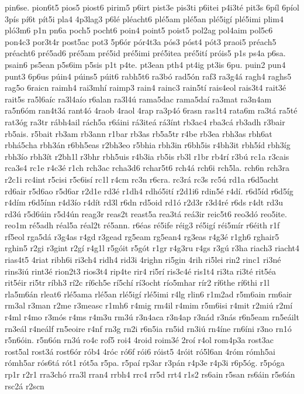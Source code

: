 {pin6se.
pion6t5
pios5
piost6
pirim5
p6irt
pist3e
pis3ti
p6itei
p4i3té
pit3s
6píl
6píol
3pís
pí6t
pít5i
pla4
4p3lag3
p6lé
pléacht6
plé5am
plé5an
plé5igí
plé5imi
plim4
pló3m6
p1n
pn6a
poch5
pocht6
poin4
point5
poist5
pol2ag
pol4aim
pol5c6
pon4c3
por3t4r
post5ac
pot3
5p6ór
pór4t3a
pós3
póst4
pót3
praoi5
préach5
préacht6
pré5ad6
pré5am
pré5id
pré5imi
pré5itea
pré5ití
próis5
p1s
ps4a
p6sa.
psain6
ps5ean
p5s6im
p5sis
p1t
p4te.
pt3ean
pth4
pt4ig
pt3is
6pu.
puin2
pun4
punt3
6p6us
púin4
púins5
púit6
rabh5t6
ra3bó
rad5ón
raf3
ra3g4á
ragh4
raghs5
rag5o
6raicn
raimh4
rai3mhí
raimp3
rain4
rainc3
rain5tí
rais4eol
rais3t4
rait3é
rait5s
ra5l6aíc
ra3l4aío
r6alan
ra3l4ú
rama5dac
rama5daí
ra3mat
ra3n4am
ra5n6óm
ran4t3á
rant4ó
4raob
4raol
4rap
ra3p4ó
6rasn
ras1t4
rata6m
ra3tá
ra5té
rat3óg
ra3tr
rábh4ail
rách5a
r6áini
rá3iteá
rá3ínt
rb3ac4
rba3cá
rb3adh
r3bair
rb5ais.
r5bait
rb3am
rb3ann
r1bar
rb3as
rb5a5tr
r4be
rb3ea
rbh3as
rbh6at
rbhá5cha
rbh3án
r6bh5eas
r2bh3eo
r5bhia
rbh3in
r6bh5is
r4bh3it
rbh5íd
rbh3íg
rbh3ío
rbh3ít
r2bh1l
r3bhr
rbh5uis
r4b3ia
rb5is
rb3l
r1br
rb4rí
r3bú
rc1a
r3cais
rca3s4
rc1e
r4c3é
r1ch
rch3ac
rcha3d6
rchar5t6
rch4á
rch6i
rch5la.
rch6n
rch3ra
r2c1i
rc4int
r5cisi
r5c6isí
rc1l
r4cm
rc3n
r6cra.
rc3rá
rc3s
rc5ú
rd1a
r6d5acht
rd6air
r5d6ao
r5d6ar
r2d1e
rd3é
r1dh4
rdhó5ití
r2d1i6
rdin5é
r4dí.
r6d5íd
r6d5íg
r4dím
r6d5ínn
r4d3ío
r4dít
rd3l
r6dn
rd5oid
rd1ó
r2d3r
r3d4ré
r6ds
r4dt
rd3u
rd3ú
r5d6úin
r5d4ún
reag3r
reas2t
reast5a
rea3tá
reá3ir
reic5t6
reo3dó
reo5ite.
reo1m
ré5adh
réal5a
réal2t
ré5ann.
r6éas
ré5ife
réig3
ré5igí
réi5mír
r6éith
r1f
rf5eol
rga5dá
r3g4as
r4gd
r3gead
rg5eam
rg5ean4
rg3eas
r4g3é
r1gh6
rghair5
rghin5
r2gi
r3gint
r2gí
r4g1l
r5góit
r5gót
r1gr
r4g3ru
r4gs
r3gú
r3ha
riach3
riacht4
rias4t5
4riat
ribh6i
ri3ch4
ridh4
rid3i
4righn
ri5gin
4rih
ri5lei
rin2
rinc1
ri3né
rins3iú
rint3é
rion2t3
rios3t4
rip4te
rir4
ri5rí
ris3c4é
ris1t4
ri3ta
ri3té
rit5éa
rit5éir
ri5tr
ríbh3
rí2c
rí6ch5e
rí5chí
rí3ocht
río5mhar
rír2
rí6the
rí6thi
r1l
rla5m6án
rleat6
rlé5ama
rlé5an
rlé5igí
rlé5imi
r4lg
rlin6
r1m2ad
r5m6ain
rm6air
rm3al
r3man
r2me
r3measc
r1mh6
r4mig
rm4il
r4mim
r5m6isi
r4mit
r2miú
r2mí
r4ml
r4mo
r3mós
r4ms
r4m3u
rm3ú
r3n4aca
r3n4ap
r3nád
r3nás
r6n5eam
rn5eáilt
rn3eál
r4neálf
rn5eoire
r4nf
rn3g
rn2i
r6n5ia
rn5id
rn3iú
rn4íne
rn6íni
r3no
rn1ó
r5n6óin.
r5n6ón
rn3ú
ro4c
rof5
roi4
4roid
roim3é
2roí
r4ol
rom4p3a
rost3ac
rost5al
rost3á
rost6ór
rób4
4róc
ró6f
rói6
róist5
4róit
ró5l6an
4róm
rómh5ai
rómh5ar
rós6tá
rót1
rót5a
r5pa.
r5paí
rp3ar
r3pán
r4p3e
r4p3i
r6p5óg.
r5póga
rp1r
r2r1
rra3chó
rra3l
rran4
rrbh4
rrc4
rr5d
rrt4
r1s2
rs6ain
r5san
rs6áin
r5s6án
rsc2á
r2scn
}
